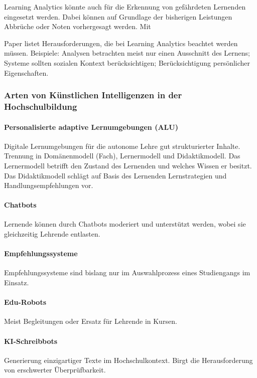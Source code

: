 Learning Analytics könnte auch für die Erkennung von gefährdeten Lernenden eingesetzt werden. Dabei können auf Grundlage der bisherigen Leistungen Abbrüche oder Noten vorhergesagt werden. Mit

Paper listet Herausforderungen, die bei Learning Analytics beachtet werden müssen. Beispiele: Analysen betrachten meist nur einen Ausschnitt des Lernens; Systeme sollten sozialen Kontext berücksichtigen; Berücksichtigung persönlicher Eigenschaften.

\subsubsection*{Arten von Künstlichen Intelligenzen in der Hochschulbildung}

\paragraph*{Personalisierte adaptive Lernumgebungen (ALU)}
Digitale Lernumgebungen für die autonome Lehre gut strukturierter Inhalte. Trennung in Domänenmodell (Fach), Lernermodell und Didaktikmodell. Das Lernermodell betrifft den Zustand des Lernenden und welches Wissen er besitzt. Das Didaktikmodell schlägt auf Basis des Lernenden Lernstrategien und Handlungsempfehlungen vor.

\paragraph*{Chatbots}
Lernende können durch Chatbots moderiert und unterstützt werden, wobei sie gleichzeitig Lehrende entlasten.

\paragraph*{Empfehlungssysteme}
Empfehlungssysteme sind bislang nur im Auswahlprozess eines Studiengangs im Einsatz.

\paragraph*{Edu-Robots}
Meist Begleitungen oder Ersatz für Lehrende in Kursen.

\paragraph*{KI-Schreibbots}
Generierung einzigartiger Texte im Hochschulkontext. Birgt die Herausforderung von erschwerter Überprüfbarkeit.

